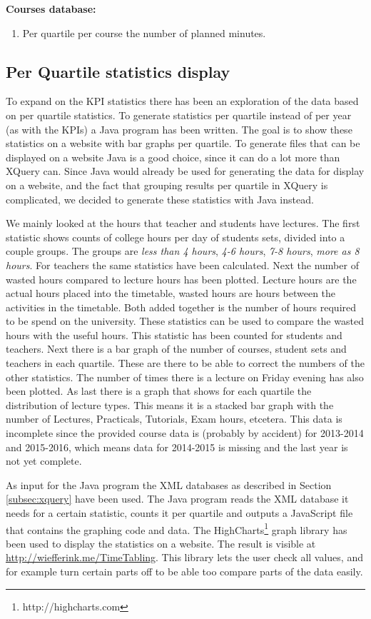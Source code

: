 \textbf{Courses database:}
\begin{enumerate}
	\item Per quartile per course the number of planned minutes.
\end{enumerate}

\subsection{Per Quartile statistics display}
To expand on the KPI statistics there has been an exploration of the data based on per quartile statistics. To generate statistics per quartile instead of per year (as with the KPIs) a Java program has been written. The goal is to show these statistics on a website with bar graphs per quartile. To generate files that can be displayed on a website Java is a good choice, since it can do a lot more than XQuery can. Since Java would already be used for generating the data for display on a website, and the fact that grouping results per quartile in XQuery is complicated, we decided to generate these statistics with Java instead.

We mainly looked at the hours that teacher and students have lectures. The first statistic shows counts of college hours per day of students sets, divided into a couple groups. The groups are \emph{less than 4 hours}, \emph{4-6 hours}, \emph{7-8 hours}, \emph{more as 8 hours}. For teachers the same statistics have been calculated. Next the number of wasted hours compared to lecture hours has been plotted. Lecture hours are the actual hours placed into the timetable, wasted hours are hours between the activities in the timetable. Both added together is the number of hours required to be spend on the university. These statistics can be used to compare the wasted hours with the useful hours. This statistic has been counted for students and teachers. Next there is a bar graph of the number of courses, student sets and teachers in each quartile. These are there to be able to correct the numbers of the other statistics. The number of times there is a lecture on Friday evening has also been plotted. As last there is a graph that shows for each quartile the distribution of lecture types. This means it is a stacked bar graph with the number of Lectures, Practicals, Tutorials, Exam hours, etcetera. This data is incomplete since the provided course data is (probably by accident) for 2013-2014 and 2015-2016, which means data for 2014-2015 is missing and the last year is not yet complete.

As input for the Java program the XML databases as described in Section \ref{subsec:xquery} have been used. The Java program reads the XML database it needs for a certain statistic, counts it per quartile and outputs a JavaScript file that contains the graphing code and data. The HighCharts\footnote{http://highcharts.com} graph library has been used to display the statistics on a website. The result is visible at \url{http://wiefferink.me/TimeTabling}. This library lets the user check all values, and for example turn certain parts off to be able too compare parts of the data easily.





